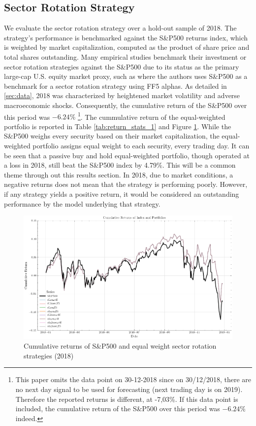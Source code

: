 \subsection{Sector Rotation Strategy}

We evaluate the sector rotation strategy over a hold-out sample of 2018. The strategy's performance is benchmarked against the S\&P500 returns index, which is weighted by market capitalization, computed as the product of share price and total shares outstanding. Many empirical studies benchmark their investment or sector rotation strategies against the S\&P500 due to its status as the primary large-cap U.S. equity market proxy, such as  where the authors uses S\&P500 as a benchmark for a sector rotation strategy using FF5 alphas. As detailed in \cref{sec:data}, 2018 was characterized by heightened market volatility and adverse macroeconomic shocks. Consequently, the cumulative return of the S\&P500 over this period was $-6.24\%$ \footnote{This paper omits the data point on 30-12-2018 since on 30/12/2018, there are no next day signal to be used for forecasting (next trading day is on 2019). Therefore the reported returns is different, at -7,03\%. If this data point is included, the cumulative return of the S\&P500 over this period was $-6.24\%$ indeed.}. The cummulative return of the equal-weighted portfolio is reported in Table \ref{tab:return_stats_1} and Figure \ref{fig:eq_w_cum_ret_plot}. While the S\&P500 weighs every security based on their market capitalization, the equal-weighted portfolio assigns equal weight to each security, every trading day. It can be seen that a passive buy and hold equal-weighted portfolio, though operated at a loss in 2018, still beat the S\&P500 index by 4.79\%. This will be a common theme through out this results section. In 2018, due to market conditions, a negative returns does not mean that the strategy is performing poorly. However, if any strategy yields a positive return, it would be considered an outstanding performance by the model underlying that strategy.

\begin{figure}[H]
    \centering
    \includegraphics[width=\textwidth]{plots/results/equal_w_cum_ret_plot.png}
    \caption{Cumulative returns of S\&P500 and equal weight sector rotation strategies (2018)}\label{fig:eq_w_cum_ret_plot}
\end{figure}


